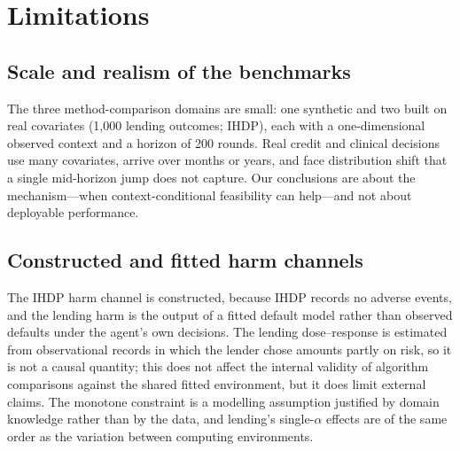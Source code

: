 \documentclass[10pt,a4paper]{article}
\begin{document}
\begin{table}[t]
\caption{\textbf{MIMIC-IV off-policy evaluation on held-out stays: constrained policy ($\alpha=0.02$)
against clinicians.} Intervals resample stays; DR is the doubly robust estimate. The arrhythmia row is exploratory and likely confounded by severity (Supplementary Note~3).}
\label{tab:mimic-ope}
\centering\small
\resizebox{\linewidth}{!}{}
\end{table}



\section*{Limitations}

\subsection*{Scale and realism of the benchmarks}
The three method-comparison domains are small: one synthetic and two built on real covariates (1,000
lending outcomes; IHDP), each with a one-dimensional observed context and a horizon of 200 rounds. Real credit and clinical decisions use many covariates, arrive over months or years, and face
distribution shift that a single mid-horizon jump does not capture. Our conclusions are about the
mechanism---when context-conditional feasibility can help---and not about deployable performance.

\subsection*{Constructed and fitted harm channels}
The IHDP harm channel is constructed, because IHDP records no adverse events, and the lending harm is
the output of a fitted default model rather than observed defaults under the agent's own decisions.
The lending dose--response is estimated from observational records in which the lender chose amounts
partly on risk, so it is not a causal quantity; this does not affect the internal validity of
algorithm comparisons against the shared fitted environment, but it does limit external claims. The
monotone constraint is a modelling assumption justified by domain knowledge rather than by the data,
and lending's single-$\alpha$ effects are of the same order as the variation between computing
environments.
\end{document}
